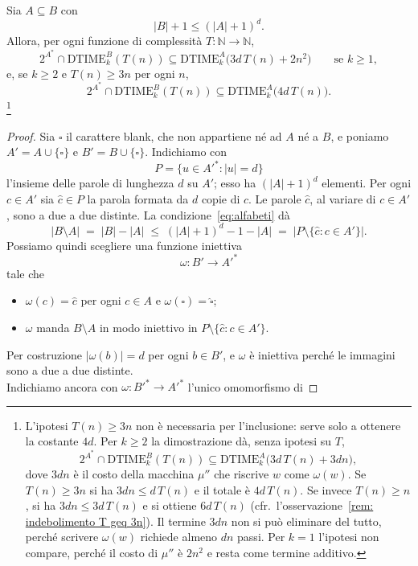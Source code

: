 \begin{lemm}\label{lem:alfabeto-ampio}
Sia $A \subseteq B$ con
\begin{equation}\label{eq:alfabeti}
  |B| + 1 \leq (|A|+1)^d.
\end{equation}
Allora, per ogni funzione di complessità $T\colon \mathbb{N} \to \mathbb{N}$,
\[
2^{A^*} \cap \mathrm{DTIME}^B_k(T(n)) \subseteq \mathrm{DTIME}^A_k\big(3d\,T(n) + 2n^2\big)
\qquad \text{se } k \geq 1,
\]
e, se $k \geq 2$ e $T(n) \geq 3n$ per ogni $n$,
\[
2^{A^*} \cap \mathrm{DTIME}^B_k(T(n)) \subseteq \mathrm{DTIME}^A_k\big(4d\,T(n)\big).
\]
\footnote{L'ipotesi $T(n)\geq 3n$ non è necessaria per l'inclusione: serve solo a ottenere la costante $4d$. Per $k\geq 2$ la dimostrazione dà, senza ipotesi su $T$,
\[
2^{A^*}\cap\mathrm{DTIME}^B_k(T(n))\subseteq\mathrm{DTIME}^A_k\big(3d\,T(n)+3dn\big),
\]
dove $3dn$ è il costo della macchina $\mu''$ che riscrive $w$ come $\omega(w)$. Se $T(n)\geq 3n$ si ha $3dn\leq d\,T(n)$ e il totale è $4d\,T(n)$. Se invece $T(n)\geq n$, si ha $3dn\leq 3d\,T(n)$ e si ottiene $6d\,T(n)$ (cfr.\ l'osservazione~\ref{rem: indebolimento T geq 3n}). Il termine $3dn$ non si può eliminare del tutto, perché scrivere $\omega(w)$ richiede almeno $dn$ passi. Per $k=1$ l'ipotesi non compare, perché il costo di $\mu''$ è $2n^2$ e resta come termine additivo.}
\begin{proof}
Sia $\square$ il carattere blank, che non appartiene né ad $A$ né a $B$, e
poniamo $A'=A\cup\{\square\}$ e $B'=B\cup\{\square\}$. Indichiamo con
\[
  P=\{u\in A'^{*} : |u|=d\}
\]
l'insieme delle parole di lunghezza $d$ su $A'$; esso ha $(|A|+1)^d$ elementi.
Per ogni $c\in A'$ sia $\hat c\in P$ la parola formata da $d$ copie di $c$.
Le parole $\hat c$, al variare di $c\in A'$, sono a due a due distinte.
La condizione~\eqref{eq:alfabeti} dà
\[
  |B\setminus A| \;=\; |B|-|A| \;\leq\; (|A|+1)^d-1-|A| \;=\; |P\setminus\{\hat c: c\in A'\}|.
\]
Possiamo quindi scegliere una funzione iniettiva
\[
  \omega\colon B'\to A'^{*}
\]
tale che
\begin{itemize}
  \item $\omega(c)=\hat c$ per ogni $c\in A$ e $\omega(\square)=\hat\square$;
  \item $\omega$ manda $B\setminus A$ in modo iniettivo in
  $P\setminus\{\hat c: c\in A'\}$.
\end{itemize}
Per costruzione $|\omega(b)|=d$ per ogni $b\in B'$, e $\omega$ è iniettiva
perché le immagini sono a due a due distinte.
\\
Indichiamo ancora con $\omega\colon B'^{*}\to A'^{*}$ l'unico omomorfismo di

\end{proof}
\end{lemm}

